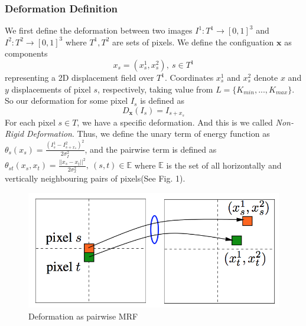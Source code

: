\documentclass{article} %
\begin{document}
	\subsubsection{Deformation Definition} We first define the deformation between two images $I^1:T^1 \to [0,1]^3$ and $I^2:T^2\to[0,1]^3$ where $T^1, T^2$ are sets of pixels. We define the configuation $\mathbf{x}$ as components
	\begin{equation}
	 	x_s = (x_s^1, x_s^2),\ s\in T^1
	\end{equation}
	representing a 2D displacement field over $T^1$. Coordinates $x_s^1$ and $x_s^2$ denote $x$ and $y$ displacements of pixel $s$, respectively, taking value from $L = \{K_{min},...,K_{max}\}$. So our deformation for some pixel $I_s$ is defined as
	\begin{equation}
		D_{\mathbf{x}}(I_s) = I_{s+x_s}
	\end{equation}
	For each pixel $s\in T$, we have a specific deformation. And this is we called \emph{Non-Rigid Deformation}. Thus, we define the unary term of energy function as $\displaystyle{\theta_s(x_s) = \frac{(I_s^1 - I_{s+x_s}^2)^2}{2\sigma_I^2}}$, and the pairwise term is defined as $\displaystyle{\theta_{st}(x_s, x_t) = \frac{||x_s-x_t||^2}{2\sigma_x^2},\ (s,t)\in\mathbb{E}}$ where $\mathbb{E}$ is the set of all horizontally and vertically neighbouring pairs of pixels(See Fig. 1).
	\begin{figure}[!hbp]
	\centering
	\includegraphics[scale = 0.75]{energy.png}
	\caption{Deformation as pairwise MRF}
	\end{figure}
\end{document}
